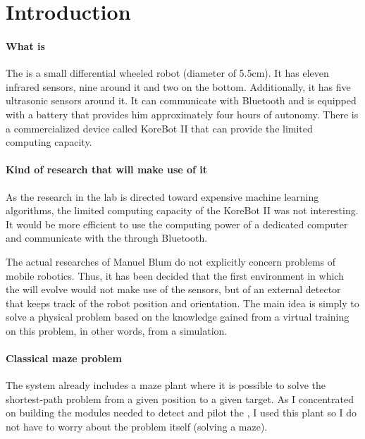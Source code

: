 \chapter{Introduction}

\subsubsection{What is \khepera{}}
The \khepera{} is a small differential wheeled robot (diameter of 5.5cm). 
It has eleven infrared sensors, nine around it and two on the bottom. 
Additionally, it has five ultrasonic sensors around it. It can communicate 
with Bluetooth and is equipped with a battery that provides him 
approximately four hours of autonomy. There is a commercialized device 
called KoreBot II that can provide the \khepera{} limited computing 
capacity. 

\subsubsection{Kind of research that will make use of it}
As the research in the lab is directed toward expensive machine learning 
algorithms, the limited computing capacity of the KoreBot II was not 
interesting. It would be more efficient to use the computing power of 
a dedicated computer and communicate with the \khepera{} through 
Bluetooth.

The actual researches of Manuel Blum do not explicitly concern problems 
of mobile robotics. Thus, it has been decided that the first environment 
in which the \khepera{} will evolve would not make use of the sensors, 
but of an external detector that keeps track of the robot position and 
orientation. The main idea is simply to solve a physical problem based 
on the knowledge gained from a virtual training on this problem, in 
other words, from a simulation.

\subsubsection{Classical maze problem}
The \clsquare{} system already includes a maze plant where it is possible 
to solve the shortest-path problem from a given position to a given 
target. As I concentrated on building the modules needed to detect and 
pilot the \khepera{}, I used this plant so I do not have to worry 
about the problem itself (solving a maze).

